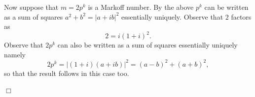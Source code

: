 \documentclass[12pt,a4paper]{amsart}
\newtheorem{thm}{Theorem}[section]
\def\HH{\mathbb{H}}
\begin{document}
Now suppose that  $m=2p^k$ is a Markoff number.
By the above  $p^k$ can be written as a sum of squares $a^2 + b^2 = |a + ib|^2$ 
essentially uniquely.
Observe that   $2$ factors as 
$$ 2 = i(1+i)^2.$$
Observe that $2 p^k$ can also  be written as a sum of squares
essentially uniquely namely
$$2p^k = |(1+i) (a + ib) |^2 =  (a-b)^2 + (a+b)^2,$$ 
so that the result follows in this case too.



\hfill $\Box$


%
% 

 
 


 
 


%
%
%
%
% 
%
\end{document}
